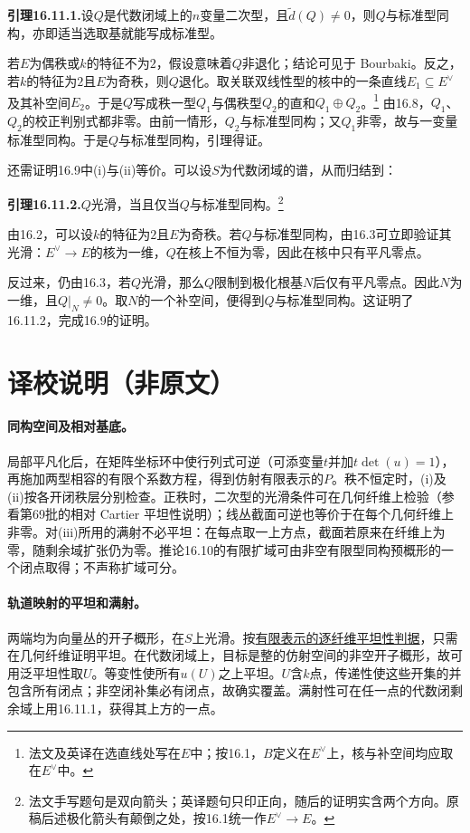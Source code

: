 \documentclass[openany,fontset=fandol]{ctexbook}
\begin{document}
\noindent\textbf{引理16.11.1.}\quad 设$Q$是代数闭域上的$n$变量二次型，且$\widetilde d(Q)\ne0$，则$Q$与标准型同构，亦即适当选取基就能写成标准型。

若$E$为偶秩或$k$的特征不为$2$，假设意味着$Q$非退化；结论可见于 Bourbaki。反之，若$k$的特征为$2$且$E$为奇秩，则$Q$退化。取关联双线性型的核中的一条直线$E_1\subseteq E^\vee$及其补空间$E_2$。于是$Q$写成秩一型$Q_1$与偶秩型$Q_2$的直和$Q_1\oplus Q_2$。\footnote{法文及英译在选直线处写在$E$中；按16.1，$B$定义在$E^\vee$上，核与补空间均应取在$E^\vee$中。} 由16.8，$Q_1$、$Q_2$的校正判别式都非零。由前一情形，$Q_2$与标准型同构；又$Q_1$非零，故与一变量标准型同构。于是$Q$与标准型同构，引理得证。

还需证明16.9中(i)与(ii)等价。可以设$S$为代数闭域的谱，从而归结到：
 
\noindent\textbf{引理16.11.2.}\quad $Q$光滑，当且仅当$Q$与标准型同构。\footnote{法文手写题句是双向箭头；英译题句只印正向，随后的证明实含两个方向。原稿后述极化箭头有颠倒之处，按16.1统一作$E^\vee\to E$。}

由16.2，可以设$k$的特征为$2$且$E$为奇秩。若$Q$与标准型同构，由16.3可立即验证其光滑：$E^\vee\to E$的核为一维，$Q$在核上不恒为零，因此在核中只有平凡零点。

反过来，仍由16.3，若$Q$光滑，那么$Q$限制到极化根基$N$后仅有平凡零点。因此$N$为一维，且$Q|_N\ne0$。取$N$的一个补空间，便得到$Q$与标准型同构。这证明了16.11.2，完成16.9的证明。

\section*{译校说明（非原文）}
\begingroup\small
\paragraph{同构空间及相对基底。}
局部平凡化后，在矩阵坐标环中使行列式可逆（可添变量$t$并加$t\det(u)=1$），再施加两型相容的有限个系数方程，得到仿射有限表示的$P$。秩不恒定时，(i)及(ii)按各开闭秩层分别检查。正秩时，二次型的光滑条件可在几何纤维上检验（参看第69批的相对 Cartier 平坦性说明）；线丛截面可逆也等价于在每个几何纤维上非零。对(iii)所用的满射不必平坦：在每点取一上方点，截面若原来在纤维上为零，随剩余域扩张仍为零。推论16.10的有限扩域可由非空有限型同构预概形的一个闭点取得；不声称扩域可分。

\paragraph{轨道映射的平坦和满射。}
两端均为向量丛的开子概形，在$S$上光滑。按\href{https://stacks.math.columbia.edu/tag/039C}{有限表示的逐纤维平坦性判据}，只需在几何纤维证明平坦。在代数闭域上，目标是整的仿射空间的非空开子概形，故可用泛平坦性取$U$。等变性使所有$u(U)$之上平坦。$U$含$k$点，传递性使这些开集的并包含所有闭点；非空闭补集必有闭点，故确实覆盖。满射性可在任一点的代数闭剩余域上用16.11.1，获得其上方的一点。
\end{document}
